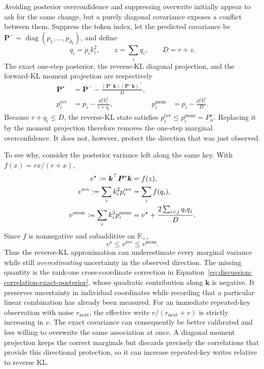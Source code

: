 \documentclass[11pt]{article}
\newcommand{\vct}[1]{\boldsymbol{#1}}
\newcommand{\diag}{\operatorname{diag}}
\begin{document}
Avoiding posterior overconfidence and suppressing overwrite initially appear to ask for the same
change, but a purely diagonal covariance exposes a conflict between them. Suppress the token
index, let the predicted covariance be
$\vct{P}^{-}=\diag(p_1,\ldots,p_{d_k})$, and define
\begin{equation}
  q_i=p_i k_i^2,
  \qquad
  z=\sum_i q_i,
  \qquad
  D=r+z.
  \label{eq:discussion-correlation-comparison-notation}
\end{equation}
The exact one-step posterior, the reverse-KL diagonal projection, and the forward-KL moment
projection are respectively
\begin{align}
  \vct{P}^{\star}
  &=\vct{P}^{-}
    -\frac{(\vct{P}^{-}\vct{k})(\vct{P}^{-}\vct{k})^\top}{D},
  \label{eq:discussion-correlation-exact-posterior}\\
  p_i^{\mathrm{rev}}
  &=p_i-\frac{p_i^2k_i^2}{r+q_i},
  &
  p_i^{\mathrm{mom}}
  &=p_i-\frac{p_i^2k_i^2}{D}.
  \label{eq:discussion-correlation-diagonal-projections}
\end{align}
Because $r+q_i\leq D$, the reverse-KL state satisfies
$p_i^{\mathrm{rev}}\leq p_i^{\mathrm{mom}}=P_{ii}^{\star}$. Replacing it by the moment
projection therefore removes the one-step marginal overconfidence. It does not, however, protect
the direction that was just observed.

To see why, consider the posterior variance left along the same key. With
$f(x)=rx/(r+x)$,
\begin{align}
  v^{\star}
  :=\vct{k}^\top\vct{P}^{\star}\vct{k}
  &=f(z), \notag\\
  v^{\mathrm{rev}}
  :=\sum_i k_i^2p_i^{\mathrm{rev}}
  &=\sum_i f(q_i), \notag\\
  v^{\mathrm{mom}}
  :=\sum_i k_i^2p_i^{\mathrm{mom}}
  &=v^{\star}
    +\frac{2\sum_{i<j}q_iq_j}{D}.
  \label{eq:discussion-directional-variance-comparison}
\end{align}
Since $f$ is nonnegative and subadditive on $\mathbb{R}_{+}$,
\begin{equation}
  v^{\star}\leq v^{\mathrm{rev}}\leq v^{\mathrm{mom}}.
  \label{eq:discussion-directional-variance-ordering}
\end{equation}
Thus the reverse-KL approximation can underestimate every marginal variance while still
\emph{overestimating} uncertainty in the observed direction. The missing quantity is the
rank-one cross-coordinate correction in
Equation~\eqref{eq:discussion-correlation-exact-posterior}, whose quadratic contribution along
$\vct{k}$ is negative. It preserves uncertainty in individual coordinates while recording that a
particular linear combination has already been measured. For an immediate repeated-key observation with noise
$r_{\mathrm{next}}$, the effective write
$v/(r_{\mathrm{next}}+v)$ is strictly increasing in $v$. The exact covariance can consequently be
better calibrated and less willing to overwrite the same association at once. A diagonal moment
projection keeps the correct marginals but discards precisely the correlations that provide this
directional protection, so it can increase repeated-key writes relative to reverse KL.
\end{document}
